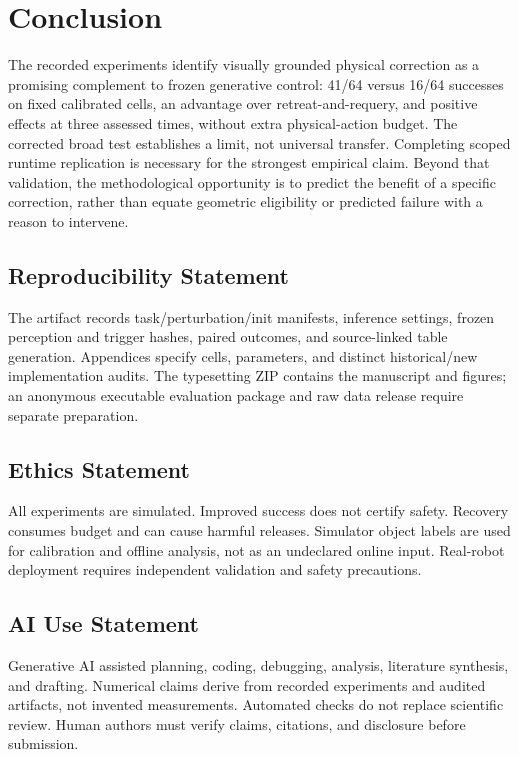 \documentclass{article}
\begin{document}
\section{Conclusion}
The recorded experiments identify visually grounded physical correction as
a promising complement to frozen generative control: 41/64 versus 16/64
successes on fixed calibrated cells, an advantage over retreat-and-requery,
and positive effects at three assessed times, without extra physical-action
budget. The corrected broad test establishes a limit, not universal transfer.
Completing scoped runtime replication is necessary for the strongest empirical
claim. Beyond that validation, the methodological opportunity is to predict
the benefit of a specific correction, rather than equate geometric
eligibility or predicted failure with a reason to intervene.
\label{sec:main_end}

\subsection*{Reproducibility Statement}
The artifact records task/perturbation/init manifests, inference settings,
frozen perception and trigger hashes, paired outcomes, and source-linked
table generation. Appendices specify cells, parameters, and distinct
historical/new implementation audits.
The typesetting ZIP contains the manuscript and figures; an anonymous
executable evaluation package and raw data release require separate preparation.

\subsection*{Ethics Statement}
All experiments are simulated. Improved success does not certify safety.
Recovery consumes budget and can cause harmful releases.
Simulator object labels are used for calibration and offline analysis,
not as an undeclared online input. Real-robot deployment requires independent
validation and safety precautions.

\subsection*{AI Use Statement}
Generative AI assisted planning, coding, debugging, analysis, literature
synthesis, and drafting. Numerical claims derive from recorded experiments
and audited artifacts, not invented measurements. Automated checks do not
replace scientific review. Human authors must verify claims, citations,
and disclosure before submission.
\end{document}
